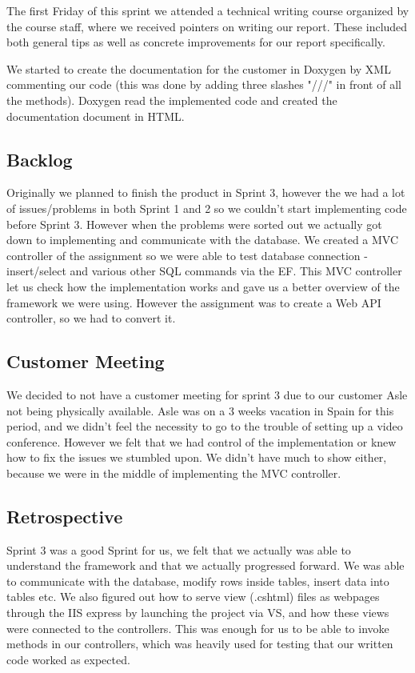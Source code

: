 The first Friday of this sprint we attended a technical writing course organized by the course staff, where we received pointers on writing our report. These included both general tips as well as concrete improvements for our report specifically.

We started to create the documentation for the customer in Doxygen by XML commenting our code (this was done by adding three slashes "///" in front of all the methods). Doxygen read the implemented code and created the documentation document in HTML. 

\subsection{Backlog}
Originally we planned to finish the product in Sprint 3, however the we had a lot of issues/problems in both Sprint 1 and 2 so we couldn't start implementing code before Sprint 3. However when the problems were sorted out we actually got down to implementing and communicate with the database. We created a MVC controller of the assignment so we were able to test database connection - insert/select and various other SQL commands via the EF. This MVC controller let us check how the implementation works and gave us a better overview of the framework we were using. However the assignment was to create a Web API controller, so we had to convert it.


\subsection{Customer Meeting}
We decided to not have a customer meeting for sprint 3 due to our customer Asle not being physically available. Asle was on a 3 weeks vacation in Spain for this period, and we didn't feel the necessity to go to the trouble of setting up a video conference.
However we felt that we had control of the implementation or knew how to fix the issues we stumbled upon. We didn't have much to show either, because we were in the middle of implementing the MVC controller.

\subsection{Retrospective}
Sprint 3 was a good Sprint for us, we felt that we actually was able to understand the framework and that we actually progressed forward. We was able to communicate with the database, modify rows inside tables, insert data into tables etc.
We also figured out how to serve view (.cshtml) files as webpages through the IIS express by launching the project via VS, and how these views were connected to the controllers. This was enough for us to be able to invoke methods in our controllers, which was heavily used for testing that our written code worked as expected.